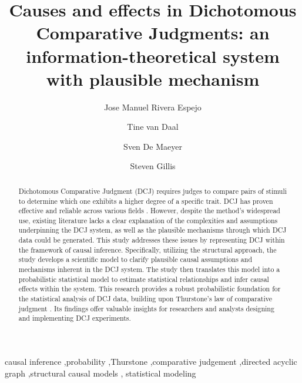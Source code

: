 \documentclass[
  authoryear,
  preprint,
  1p]{elsarticle}
\begin{document}
\begin{frontmatter}
\title{Causes and effects in Dichotomous Comparative Judgments: an
information-theoretical system with plausible mechanism}
\author[1]{Jose Manuel Rivera Espejo%
%
}
\author[1]{Tine van Daal%
%
}
\author[1]{Sven De Maeyer%
%
}
\author[2]{Steven Gillis%
%
}






        
\begin{abstract}
Dichotomous Comparative Judgment (DCJ) requires judges to compare pairs
of stimuli to determine which one exhibits a higher degree of a specific
trait. DCJ has proven effective and reliable across various fields
\citep{Pollitt_2012b, Jones_2015, vanDaal_et_al_2016, Bartholomew_et_al_2018, Lesterhuis_2018, Bartholomew_et_al_2020, Marshall_et_al_2020, Boonen_et_al_2020}.
However, despite the method's widespread use, existing literature lacks
a clear explanation of the complexities and assumptions underpinning the
DCJ system, as well as the plausible mechanisms through which DCJ data
could be generated. This study addresses these issues by representing
DCJ within the framework of causal inference. Specifically, utilizing
the structural approach, the study develops a scientific model to
clarify plausible causal assumptions and mechanisms inherent in the DCJ
system. The study then translates this model into a probabilistic
statistical model to estimate statistical relationships and infer causal
effects within the system. This research provides a robust probabilistic
foundation for the statistical analysis of DCJ data, building upon
Thurstone's law of comparative judgment \citeyearpar{Thurstone_1927}.
Its findings offer valuable insights for researchers and analysts
designing and implementing DCJ experiments.
\end{abstract}





\begin{keyword}
    causal inference \sep probability \sep Thurstone \sep comparative
judgement \sep directed acyclic graph \sep structural causal
models \sep 
    statistical modeling
\end{keyword}
\end{frontmatter}
    
\end{document}
